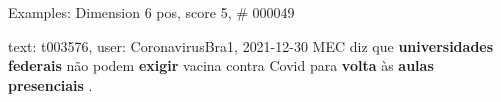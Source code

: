 \begin{frame}{Examples: Dimension 6 pos, score 5, \# 000049}
\footnotesize
\begin{exampleblock}{text: t003576, user: CoronavirusBra1, 2021-12-30}
MEC diz que \textbf{universidades} \textbf{federais} não podem \textbf{exigir} 
vacina contra Covid para \textbf{volta} às \textbf{aulas} \textbf{presenciais} 
. 
\end{exampleblock}
\end{frame}
